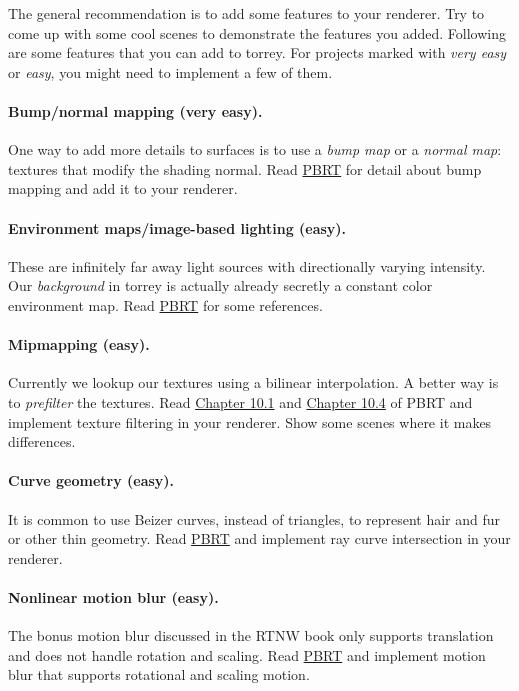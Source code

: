 The general recommendation is to add some features to your renderer. Try to come up with some cool scenes to demonstrate the features you added. Following are some features that you can add to torrey. For projects marked with \emph{very easy} or \emph{easy}, you might need to implement a few of them.

\paragraph{Bump/normal mapping (very easy).}
One way to add more details to surfaces is to use a \emph{bump map} or a \emph{normal map}: textures that modify the shading normal. Read \href{https://www.pbr-book.org/3ed-2018/Materials/Bump_Mapping}{PBRT} for detail about bump mapping and add it to your renderer.

\paragraph{Environment maps/image-based lighting (easy).}
These are infinitely far away light sources with directionally varying intensity. Our \emph{background} in torrey is actually already secretly a constant color environment map. Read \href{https://www.pbr-book.org/3ed-2018/Light_Sources/Infinite_Area_Lights}{PBRT} for some references. 

\paragraph{Mipmapping (easy).}
Currently we lookup our textures using a bilinear interpolation. A better way is to \emph{prefilter} the textures. Read \href{https://www.pbr-book.org/3ed-2018/Texture/Sampling_and_Antialiasing.html}{Chapter 10.1} and \href{https://www.pbr-book.org/3ed-2018/Texture/Image_Texture}{Chapter 10.4} of PBRT and implement texture filtering in your renderer. Show some scenes where it makes differences.

\paragraph{Curve geometry (easy).}
It is common to use Beizer curves, instead of triangles, to represent hair and fur or other thin geometry. Read \href{https://www.pbr-book.org/3ed-2018/Shapes/Curves}{PBRT} and implement ray curve intersection in your renderer.

\paragraph{Nonlinear motion blur (easy).}
The bonus motion blur discussed in the RTNW book only supports translation and does not handle rotation and scaling. Read \href{https://www.pbr-book.org/3ed-2018/Geometry_and_Transformations/Animating_Transformations}{PBRT} and implement motion blur that supports rotational and scaling motion.

